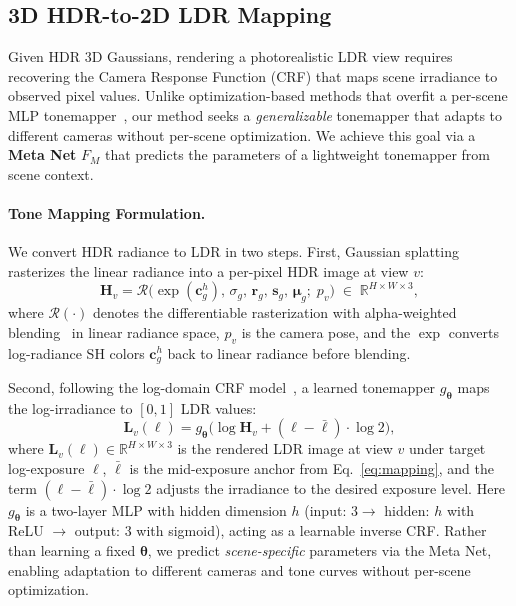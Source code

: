 \documentclass[runningheads]{llncs}
\begin{document}
\subsection{3D HDR-to-2D LDR Mapping}
\label{sec:tonemapping}

Given HDR 3D Gaussians, rendering a photorealistic LDR view requires recovering the Camera Response Function (CRF) that maps scene irradiance to observed pixel values.
Unlike optimization-based methods that overfit a per-scene MLP tonemapper~\cite{liu2025gausshdr,cai2024hdr}, our method seeks a \emph{generalizable} tonemapper that adapts to different cameras without per-scene optimization.
We achieve this goal via a \textbf{Meta Net} $F_M$ that predicts the parameters of a lightweight tonemapper from scene context.


\paragraph{\textbf{Tone Mapping Formulation.}}
We convert HDR radiance to LDR in two steps.
First, Gaussian splatting rasterizes the linear radiance into a per-pixel HDR image at view $v$:
\begin{equation}
    \mathbf{H}_v
    = \mathcal{R}\!\bigl(\exp(\boldsymbol{c}_g^{h}),\,
      \sigma_g,\, \boldsymbol{r}_g,\, \boldsymbol{s}_g,\, \boldsymbol{\mu}_g;\; p_v\bigr)
    \;\in\; \mathbb{R}^{H \times W \times 3},
\label{eq:rasterize}
\end{equation}
where $\mathcal{R}(\cdot)$ denotes the differentiable rasterization with alpha-weighted blending~\cite{kerbl20233d} in linear radiance space, $p_v$ is the camera pose, and the $\exp$ converts log-radiance SH colors $\boldsymbol{c}_g^{h}$ back to linear radiance before blending.

Second, following the log-domain CRF model~\cite{debevec2023recovering}, a learned tonemapper $g_{\boldsymbol{\theta}}$ maps the log-irradiance to $[0,1]$ LDR values:
\begin{equation}
    \mathbf{L}_v(\ell)
    = g_{\boldsymbol{\theta}}\!\bigl(
      \log \mathbf{H}_v
      + (\ell - \bar{\ell})\cdot\log 2
    \bigr),
\label{eq:tonemap}
\end{equation}
where $\mathbf{L}_v(\ell) \in \mathbb{R}^{H \times W \times 3}$ is the rendered LDR image at view $v$ under target log-exposure $\ell$, $\bar{\ell}$ is the mid-exposure anchor from Eq.~\eqref{eq:mapping}, and the term $(\ell - \bar{\ell})\cdot\log 2$ adjusts the irradiance to the desired exposure level.
Here $g_{\boldsymbol{\theta}}$ is a two-layer MLP with hidden dimension $h$ (input: $3 \to$ hidden: $h$ with ReLU $\to$ output: $3$ with sigmoid), acting as a learnable inverse CRF.
Rather than learning a fixed $\boldsymbol{\theta}$, we predict \emph{scene-specific} parameters via the Meta Net, enabling adaptation to different cameras and tone curves without per-scene optimization.
\end{document}
